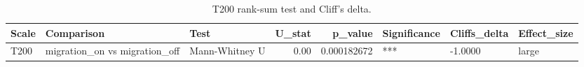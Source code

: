 \begin{table}[htbp]
\centering
\caption{T200 rank-sum test and Cliff's delta.}
\label{tab:t200_wilcoxon_ranksum_cliffs_delta}
\begin{tabular}{lllrrlll}
\toprule
Scale & Comparison & Test & U_stat & p_value & Significance & Cliffs_delta & Effect_size \\
\midrule
T200 & migration_on vs migration_off & Mann-Whitney U & 0.00 & 0.000182672 & *** & -1.0000 & large \\
\bottomrule
\end{tabular}
\end{table}
